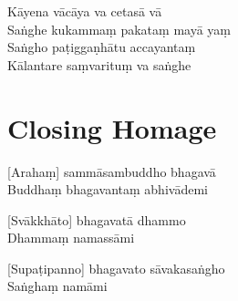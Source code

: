 \enlargethispage{\baselineskip}


Kāyena vācāya va cetasā vā\\
Saṅghe kukammaṃ pakataṃ mayā yaṃ\\
Saṅgho paṭiggaṇhātu accayantaṃ\\
Kālantare saṃvarituṃ va saṅghe

\section*{Closing Homage}

[Arahaṃ] sammāsambuddho bhagavā\\
Buddhaṃ bhagavantaṃ abhivādemi

[Svākkhāto] bhagavatā dhammo\\
Dhammaṃ namassāmi

[Supaṭipanno] bhagavato sāvakasaṅgho\\
Saṅghaṃ namāmi

